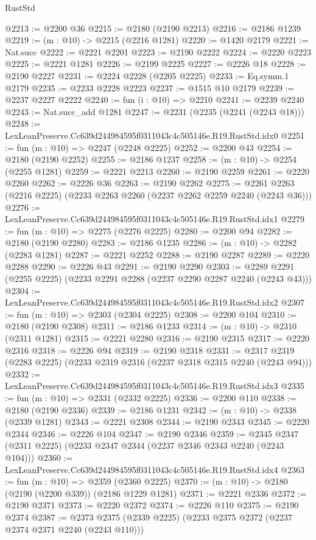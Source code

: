 \begin{lexlean}{RustStd}
\begin{coremodule}
@2213 := @2200 @36
@2215 := @2180 (@2190 @2213)
@2216 := @2186 @1239
@2219 := (m : @10) -> @2215 (@2216 @1281)
@2220 := @1420 @2179
@2221 := Nat.succ
@2222 := @2221 @2201
@2223 := @2190 @2222
@2224 := @2220 @2223
@2225 := @2221 @1281
@2226 := @2199 @2225
@2227 := @2226 @18
@2228 := @2190 @2227
@2231 := @2224 @2228 (@2205 @2225)
@2233 := Eq.symm.{1} @2179
@2235 := @2233 @2228 @2223
@2237 := @1515 @10 @2179
@2239 := @2237 @2227 @2222
@2240 := fun (i : @10) => @2210
@2241 := @2239 @2240
@2243 := Nat.succ_add @1281
@2247 := @2231 (@2235 (@2241 (@2243 @18)))
@2248 := LexLeanPreserve.Cc639d244984595f0311043c4c505146e.R19.RustStd.idx0
@2251 := fun (m : @10) => @2247 (@2248 @2225)
@2252 := @2200 @43
@2254 := @2180 (@2190 @2252)
@2255 := @2186 @1237
@2258 := (m : @10) -> @2254 (@2255 @1281)
@2259 := @2221 @2213
@2260 := @2190 @2259
@2261 := @2220 @2260
@2262 := @2226 @36
@2263 := @2190 @2262
@2275 := @2261 @2263 (@2216 @2225) (@2233 @2263 @2260 (@2237 @2262 @2259 @2240 (@2243 @36)))
@2276 := LexLeanPreserve.Cc639d244984595f0311043c4c505146e.R19.RustStd.idx1
@2279 := fun (m : @10) => @2275 (@2276 @2225)
@2280 := @2200 @94
@2282 := @2180 (@2190 @2280)
@2283 := @2186 @1235
@2286 := (m : @10) -> @2282 (@2283 @1281)
@2287 := @2221 @2252
@2288 := @2190 @2287
@2289 := @2220 @2288
@2290 := @2226 @43
@2291 := @2190 @2290
@2303 := @2289 @2291 (@2255 @2225) (@2233 @2291 @2288 (@2237 @2290 @2287 @2240 (@2243 @43)))
@2304 := LexLeanPreserve.Cc639d244984595f0311043c4c505146e.R19.RustStd.idx2
@2307 := fun (m : @10) => @2303 (@2304 @2225)
@2308 := @2200 @104
@2310 := @2180 (@2190 @2308)
@2311 := @2186 @1233
@2314 := (m : @10) -> @2310 (@2311 @1281)
@2315 := @2221 @2280
@2316 := @2190 @2315
@2317 := @2220 @2316
@2318 := @2226 @94
@2319 := @2190 @2318
@2331 := @2317 @2319 (@2283 @2225) (@2233 @2319 @2316 (@2237 @2318 @2315 @2240 (@2243 @94)))
@2332 := LexLeanPreserve.Cc639d244984595f0311043c4c505146e.R19.RustStd.idx3
@2335 := fun (m : @10) => @2331 (@2332 @2225)
@2336 := @2200 @110
@2338 := @2180 (@2190 @2336)
@2339 := @2186 @1231
@2342 := (m : @10) -> @2338 (@2339 @1281)
@2343 := @2221 @2308
@2344 := @2190 @2343
@2345 := @2220 @2344
@2346 := @2226 @104
@2347 := @2190 @2346
@2359 := @2345 @2347 (@2311 @2225) (@2233 @2347 @2344 (@2237 @2346 @2343 @2240 (@2243 @104)))
@2360 := LexLeanPreserve.Cc639d244984595f0311043c4c505146e.R19.RustStd.idx4
@2363 := fun (m : @10) => @2359 (@2360 @2225)
@2370 := (m : @10) -> @2180 (@2190 (@2200 @339)) (@2186 @1229 @1281)
@2371 := @2221 @2336
@2372 := @2190 @2371
@2373 := @2220 @2372
@2374 := @2226 @110
@2375 := @2190 @2374
@2387 := @2373 @2375 (@2339 @2225) (@2233 @2375 @2372 (@2237 @2374 @2371 @2240 (@2243 @110)))

\end{coremodule}
\end{lexlean}
